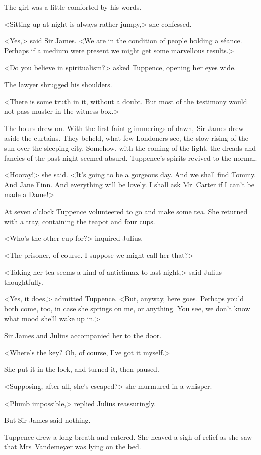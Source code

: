 The girl was a little comforted by his words.

<Sitting up at night is always rather jumpy,> she confessed.

<Yes,> said Sir James. <We are in the condition of people holding a séance. Perhaps if a medium were present we might get some marvellous results.>

<Do you believe in spiritualism?> asked Tuppence, opening her eyes wide.

The lawyer shrugged his shoulders.

<There is some truth in it, without a doubt. But most of the testimony would not pass muster in the witness-box.>

The hours drew on. With the first faint glimmerings of dawn, Sir James drew aside the curtains. They beheld, what few Londoners see, the slow rising of the sun over the sleeping city. Somehow, with the coming of the light, the dreads and fancies of the past night seemed absurd. Tuppence's spirits revived to the normal.

<Hooray!> she said. <It's going to be a gorgeous day. And we shall find Tommy. And Jane Finn. And everything will be lovely. I shall ask Mr~Carter if I can't be made a Dame!>

At seven o'clock Tuppence volunteered to go and make some tea. She returned with a tray, containing the teapot and four cups.

<Who's the other cup for?> inquired Julius.

<The prisoner, of course. I suppose we might call her that?>

<Taking her tea seems a kind of anticlimax to last night,> said Julius thoughtfully.

<Yes, it does,> admitted Tuppence. <But, anyway, here goes. Perhaps you'd both come, too, in case she springs on me, or anything. You see, we don't know what mood she'll wake up in.>

Sir James and Julius accompanied her to the door.

<Where's the key? Oh, of course, I've got it myself.>

She put it in the lock, and turned it, then paused.

<Supposing, after all, she's escaped?> she murmured in a whisper.

<Plumb impossible,> replied Julius reassuringly.

But Sir James said nothing.

Tuppence drew a long breath and entered. She heaved a sigh of relief as she saw that Mrs~Vandemeyer was lying on the bed.

